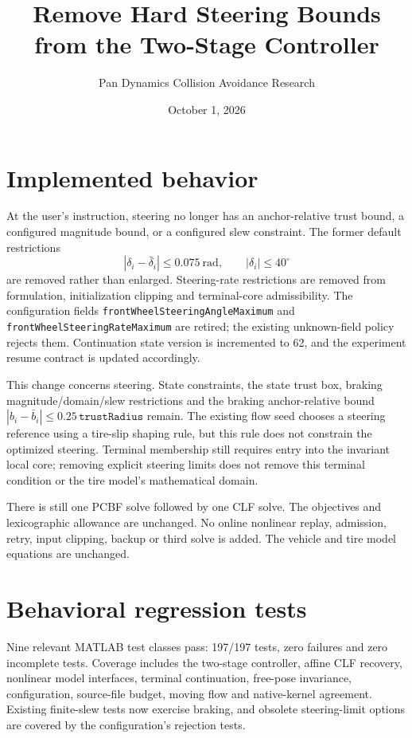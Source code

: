 \documentclass[11pt]{article}
\title{Remove Hard Steering Bounds from the Two-Stage Controller}
\author{Pan Dynamics Collision Avoidance Research}
\date{October 1, 2026}
\begin{document}
\maketitle
\section{Implemented behavior}
At the user's instruction, steering no longer has an anchor-relative trust
bound, a configured magnitude bound, or a configured slew constraint.
The former default restrictions
\[
 |\delta_i-\bar\delta_i|\le0.075\ \mathrm{rad},\qquad
 |\delta_i|\le40^\circ
\]
are removed rather than enlarged. Steering-rate restrictions are removed
from formulation, initialization clipping and terminal-core admissibility.
The configuration fields \texttt{frontWheelSteeringAngleMaximum} and
\texttt{frontWheelSteeringRateMaximum} are retired; the existing unknown-field
policy rejects them. Continuation state version is incremented to 62, and
the experiment resume contract is updated accordingly.

This change concerns steering. State constraints, the state trust box, braking
magnitude/domain/slew restrictions and the braking anchor-relative bound
$|b_i-\bar b_i|\le0.25\,\texttt{trustRadius}$ remain. The existing flow seed
chooses a steering reference using a tire-slip shaping rule, but this rule
does not constrain the optimized steering. Terminal membership still requires
entry into the invariant local core; removing explicit steering limits does
not remove this terminal condition or the tire model's mathematical domain.

There is still one PCBF solve followed by one CLF solve. The objectives and
lexicographic allowance are unchanged. No online nonlinear replay, admission,
retry, input clipping, backup or third solve is added. The vehicle and tire
model equations are unchanged.

\section{Behavioral regression tests}
Nine relevant MATLAB test classes pass: 197/197 tests, zero failures and zero
incomplete tests. Coverage includes the two-stage controller, affine CLF
recovery, nonlinear model interfaces, terminal continuation, free-pose
invariance, configuration, source-file budget, moving flow and native-kernel
agreement. Existing finite-slew tests now exercise braking, and obsolete
steering-limit options are covered by the configuration's rejection tests.
\end{document}
